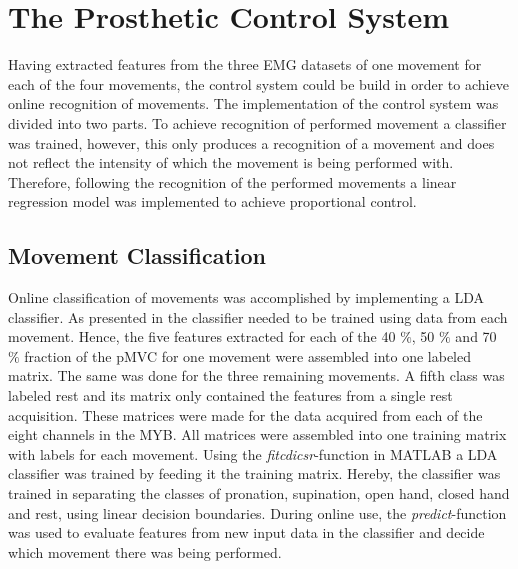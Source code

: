 
\section{The Prosthetic Control System}

Having extracted features from the three EMG datasets of one movement for each of the four movements, the control system could be build in order to achieve online recognition of movements. The implementation of the control system was divided into two parts. To achieve recognition of performed movement a classifier was trained, however, this only produces a recognition of a movement and does not reflect the intensity of which the movement is being performed with. Therefore, following the recognition of the performed movements a linear regression model was implemented to achieve proportional control. 

\subsection{Movement Classification}

Online classification of movements was accomplished by implementing a LDA classifier. As presented in  the classifier needed to be trained using data from each movement. Hence, the five features extracted for each of the 40 $\percent$, 50 $\percent$ and 70 $\percent$ fraction of the pMVC for one movement were assembled into one labeled matrix. The same was done for the three remaining movements. A fifth class was labeled rest and its matrix only contained the features from a single rest acquisition. These matrices were made for the data acquired from each of the eight channels in the MYB. All matrices were assembled into one training matrix with labels for each movement. Using the \textit{fitcdicsr}-function in MATLAB a LDA classifier was trained by feeding it the training matrix. Hereby, the classifier was trained in separating the classes of pronation, supination, open hand, closed hand and rest, using linear decision boundaries. During online use, the \textit{predict}-function was used to evaluate features from new input data in the classifier and decide which movement there was being performed.    


